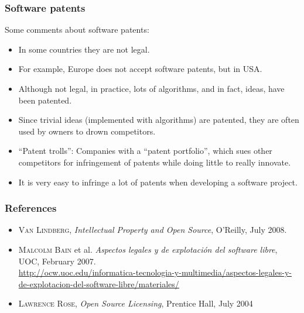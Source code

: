 
\begin{frame}
\frametitle{Software patents}

Some comments about software patents:
\begin{itemize}
\item In some countries they are not legal.
\item For example, Europe does not accept software patents, but
in USA.
\item Although not legal, in
  practice, lots of algorithms, and in fact, ideas, have been
  patented.
\item Since trivial ideas (implemented with algorithms) are patented,
  they are often used by owners to drown competitors.
\item ``Patent trolls'': Companies with a ``patent portfolio'', which
  sues other competitors  for infringement of patents while doing
  little to really innovate.
\item It is very easy to infringe a lot of patents when developing a
  software project.
\end{itemize}

\end{frame}



\begin{frame}
\frametitle{References}

\begin{itemize}
\item \textsc{Van Lindberg}, \textit{Intellectual Property and Open Source}, O'Reilly, July 2008.
\item \textsc{Malcolm Bain} et al. \textit{Aspectos legales y de explotación del software libre}, UOC, February 2007. \\
\url{http://ocw.uoc.edu/informatica-tecnologia-y-multimedia/aspectos-legales-y-de-explotacion-del-software-libre/materiales/}
\item \textsc{Lawrence Rose}, \textit{Open Source Licensing}, Prentice Hall, July 2004 
\end{itemize}

\end{frame}





